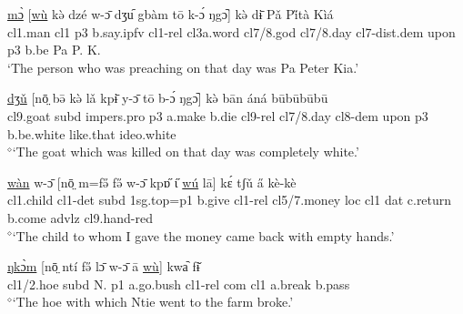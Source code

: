 \documentclass[10pt,twoside]{article}
\newcommand{\gl}[1]{`#1'}
\def\VSP{\vspace{0pt}}
\newcommand{\cl}[1]{{\sc cl#1}}
\def\elicited{$^\diamond$}
\def\ih{ɩ}
\begin{document}
\begin{exe}
	\ex \label{exThePersonWhoWasPreaching1} 		
		\gll \uline{mɔ̀} [\uline{wù} kə̀ dzé w-ɔ̄ dʒu᷇ gbàm tō k-ɔ́ ŋgɔ᷆] kə̀ dɨ̄ Pǎ Pi̋tà Kìá\\
		\cl1.man	\cl1 	{\sc p3}	b.say.{\sc ipfv}	\cl1-{\sc rel}	\cl3a.word \cl7/8.god	\cl7/8.day	\cl7-{\sc dist.dem}	 upon	{\sc p3}	b.be	Pa P. K. \\
		\glt \VSP \gl{The person who was preaching on that day was Pa Peter Kia.}
\end{exe}%
\begin{exe} 
	\ex \label{exGoatTheyKilled}	

		\gll	\uline{dʒǔ} [nō̤ bə̄ kə̀ lǎ kpɨ̄ y-ɔ̄ tō b-ɔ́ ŋgɔ᷆] kə̀ bān áná būbūbūbū			\\
			\cl9.goat {\sc subd} {\sc impers.pro} {\sc p3} a.make b.die \cl9-{\sc rel} \cl7/8.day \cl8-{\sc dem} upon {\sc p3} b.be.white like.that {\sc ideo}.white		\\
		\glt \VSP \elicited \gl{The goat which was killed on that day was completely white.}
\end{exe}%

\begin{exe}
	\ex \label{exChildWhomIGaveMoney}	

		\gll	\uline{wàn} w-ɔ̄ [nō̤ m=fə̋ fə̋ w-ɔ̄ kpɒ̋ {\H\ih} \uline{wú} lā] kɛ́ tʃǔ a̋ kè-kè	\\
			\cl1.child \cl1-{\sc det} {\sc subd} {\sc 1sg.top}={\sc p1} b.give	\cl1-{\sc rel} \cl5/7.money {\sc loc} \cl1 {\sc dat} c.return b.come {\sc advlz} \cl9.hand-{\sc red} 				\\
		\glt \VSP \elicited \gl{The child to whom I gave the money came back with empty hands.}

\end{exe}%

\begin{exe}
	\ex \label{exTheHoeWithWhich}	
		\gll	\uline{ŋkɔ̀m} [nō̤ ntí fə̋ lɔ̄ w-ɔ̄ ā \uline{wù}] kwa᷆ fɨ̌  	\\
			\cl1/2.hoe {\sc subd} N. {\sc p1} a.go.bush	\cl1-{\sc rel} {\sc com} \cl1 a.break b.pass 				\\
		\glt \VSP \elicited \gl{The hoe with which Ntie went to the farm broke.}
\end{exe}
\end{document}
